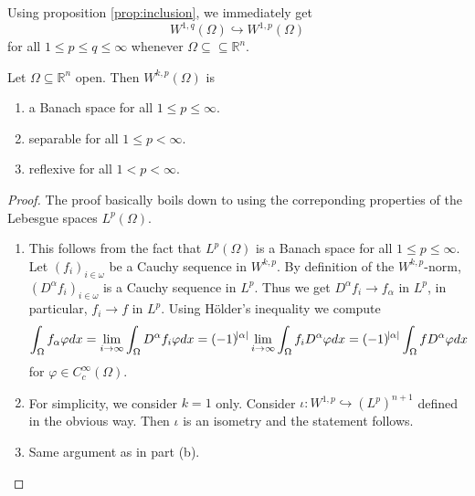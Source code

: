 \begin{remark}
	Using proposition \ref{prop:inclusion}, we immediately get
	\begin{equation*}
		W^{1,q}(\Omega) \hookrightarrow W^{1,p}(\Omega)
	\end{equation*}
	\noindent for all $1 \leq p \leq q \leq \infty$ whenever $\Omega \subseteq \subseteq \mathbb{R}^n$.
\end{remark}

\begin{theorem}
	Let $\Omega \subseteq \mathbb{R}^n$ open. Then $W^{k,p}(\Omega)$ is
	\begin{enumerate}[label = \textup{(}\alph*\textup{)},wide = 0pt]
		\item a Banach space for all $1 \leq p \leq \infty$.
		\item separable for all $1 \leq p < \infty$.
		\item reflexive for all $1 < p < \infty$.
	\end{enumerate}
\end{theorem}

\begin{proof}
	The proof basically boils down to using the correponding properties of the Lebesgue spaces $L^p(\Omega)$.
	\begin{enumerate}[label = \textup{(}\alph*\textup{)},wide = 0pt]
		\item This follows from the fact that $L^p(\Omega)$ is a Banach space for all $1 \leq p \leq \infty$. Let $(f_i)_{i \in \omega}$ be a Cauchy sequence in $W^{k,p}$. By definition of the $W^{k,p}$-norm, $(D^\alpha f_i)_{i \in \omega}$ is a Cauchy sequence in $L^p$. Thus we get $D^\alpha f_i \to f_\alpha$ in $L^p$, in particular, $f_i \to f$ in $L^p$. Using H\"older's inequality we compute
			\begin{equation*}
				\int_\Omega f_\alpha \varphi dx = \lim_{i \to \infty} \int_\Omega D^\alpha f_i \varphi dx = (-1)^{\abs{\alpha}} \lim_{i \to \infty}\int_\Omega f_i D^\alpha \varphi dx = (-1)^{\abs{\alpha}}\int_\Omega f D^\alpha \varphi dx
			\end{equation*}
			\noindent for $\varphi \in C^\infty_c(\Omega)$.
		\item For simplicity, we consider $k = 1$ only. Consider $\iota : W^{1,p} \hookrightarrow (L^p)^{n + 1}$ defined in the obvious way. Then $\iota$ is an isometry and the statement follows. 
		\item Same argument as in part (b).
	\end{enumerate}
\end{proof}

